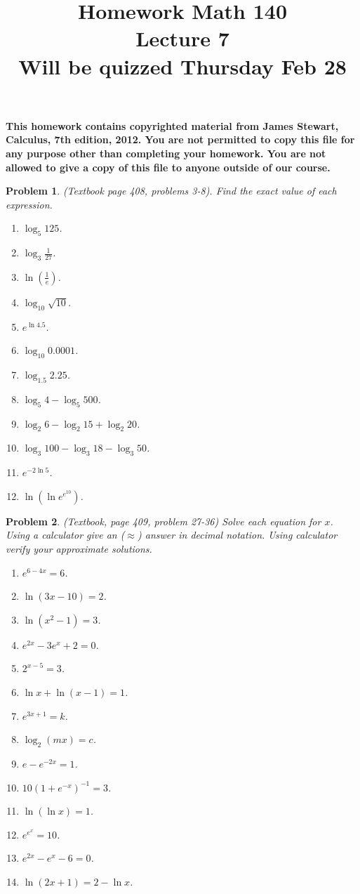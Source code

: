 \documentclass{article}
\date{}
\title{
Homework Math 140 \\
Lecture 7 \\
Will be quizzed Thursday Feb 28
}
\newtheorem{problem}{Problem}
\begin{document}
\maketitle
\textbf{This homework contains copyrighted material from  James Stewart, Calculus, 7th edition, 2012. 
You are not permitted to copy this file for any purpose other than completing your homework. You are not allowed to give a copy of this file to anyone outside of our course. 
}

\begin{problem}(Textbook page 408, problems 3-8). Find the exact value of each expression.
\begin{multicols}{3}
\begin{enumerate}
\item $\log_5 125$.
\item $\log_3 \frac{1}{27}$.
\item $\ln \left(\frac{1}{e}\right) $.
\item $\log_{10}\sqrt{10}$.
\item $e^{\ln 4.5}$.
\item $\log_{10} 0.0001 $.
\item $\log_{1.5}2.25$.
\item $\log_5 4- \log_5 500$.
\item $\log_2 6 - \log_2 15 +\log_2 20$.
\item $\log_3 100- \log_3 18 - \log _3 50 $.
\item $e^{-2\ln 5}$.
\item $\ln \left(\ln e^{e^{10}}\right)$.
\end{enumerate}
\end{multicols}
\end{problem}
\begin{problem}(Textbook, page 409, problem 27-36)
Solve each equation for $x$. Using a calculator give an ($\approx$) answer in decimal notation. Using calculator verify your approximate solutions.
\begin{multicols}{2}
\begin{enumerate}
\item $e^{6-4x}=6$.
\item $\ln (3x-10)=2$.
\item $\ln (x^2-1)=3$.
\item $e^{2x}-3e^x+2=0$.
\item $2^{x-5}=3$.
\item $\ln x+\ln (x-1)=1$.
\item $e^{3x+1}=k$.
\item $\log_2(mx)=c$.
\item $e- e^{-2x}=1$.
\item $10(1+e^{-x})^{-1}=3$.
\item $\ln (\ln x)=1$.
\item $e^{e^x}=10$.
\item $e^{2x}-e^x-6=0$.
\item $\ln(2x+1)=2-\ln x$.
\end{enumerate}
\end{multicols}
\end{problem}
\end{document}
